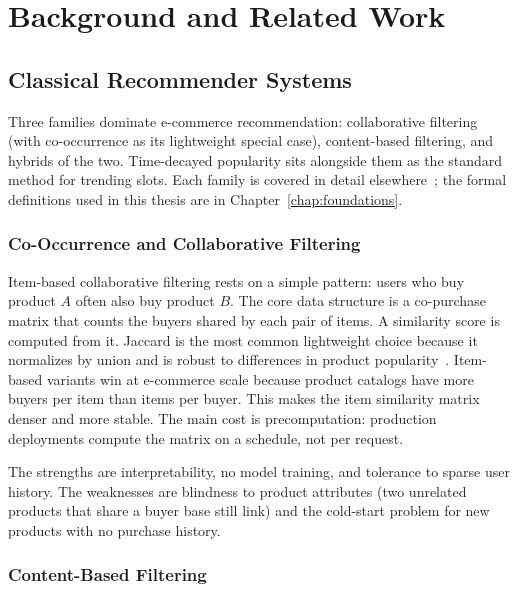 \chapter{Background and Related Work}
\label{chap:background}

\section{Classical Recommender Systems}
\label{sec:bg-recsys}

Three families dominate e-commerce recommendation: collaborative
filtering (with co-occurrence as its lightweight special case),
content-based filtering, and hybrids of the two. Time-decayed
popularity sits alongside them as the standard method for
trending slots. Each family is covered in detail
elsewhere~\cite{ComprehensiveRecSys2024, LLM4Rec2025}; the formal
definitions used in this thesis are in
Chapter~\ref{chap:foundations}.

\subsection{Co-Occurrence and Collaborative Filtering}
\label{subsec:bg-cooccurrence}

Item-based collaborative filtering rests on a simple pattern:
users who buy product $A$ often also buy product $B$. The core
data structure is a co-purchase matrix that counts the buyers
shared by each pair of items. A similarity score is computed
from it. Jaccard is the most common lightweight choice because
it normalizes by union and is robust to differences in product
popularity~\cite{ComprehensiveRecSys2024}. Item-based variants
win at e-commerce scale because product catalogs have more buyers
per item than items per buyer. This makes the item similarity
matrix denser and more stable. The main cost is precomputation:
production deployments compute the matrix on a schedule, not per
request.

The strengths are interpretability, no model training, and
tolerance to sparse user history. The weaknesses are blindness to
product attributes (two unrelated products that share a buyer
base still link) and the cold-start problem for new products with
no purchase history.

\subsection{Content-Based Filtering}
\label{subsec:bg-content}

